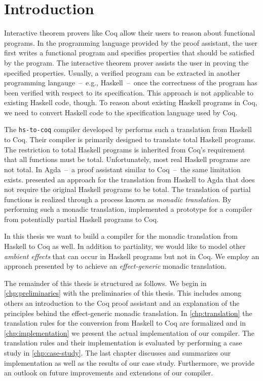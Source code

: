 \chapter{Introduction} \label{chp:introduction}

Interactive theorem provers like Coq allow their users to reason about functional programs.
In the programming language provided by the proof assistant, the user first writes a functional program and specifies properties that should be satisfied by the program.
The interactive theorem prover assists the user in proving the specified properties.
Usually, a verified program can be extracted in another programming langauge~--~e.g., Haskell~--~once the correctness of the program has been verified with respect to its specification.
This approach is not applicable to existing Haskell code, though.
To reason about existing Haskell programs in Coq, we need to convert Haskell code to the specification language used by Coq.

The \texttt{hs-to-coq} compiler developed by \cite{SpectorZabusky:2017} performs such a translation from Haskell to Coq.
Their compiler is primarily designed to translate total Haskell programs.
The restriction to total Haskell programs is inherited from Coq's requirement that all functions must be total.
Unfortunately, most real Haskell programs are not total.
In Agda~--~a proof assistant similar to Coq~--~the same limitation exists.
\cite{Abel:2005} presented an approach for the translation from Haskell to Agda that does not require the original Haskell programs to be total.
The translation of partial functions is realized through a process known as \textit{monadic translation}.
By performing such a monadic translation, \cite{Jessen:2019} implemented a prototype for a compiler from potentially partial Haskell programs to Coq.

In this thesis we want to build a compiler for the monadic translation from Haskell to Coq as well.
In addition to partiality, we would like to model other \textit{ambient effects} \citep{Christiansen:2019} that can occur in Haskell programs but not in Coq.
We employ an approach presented by \cite{Dylus:2018} to achieve an \textit{effect-generic} monadic translation.

The remainder of this thesis is structured as follows.
We begin in \autoref{chp:preliminaries} with the preliminaries of this thesis.
This includes among others an introduction to the Coq proof assistant and an explanation of the principles behind the effect-generic monadic translation.
In \autoref{chp:translation} the translation rules for the conversion from Haskell to Coq are formalized and in \autoref{chp:implementation} we present the actual implementation of our compiler.
The translation rules and their implementation is evaluated by performing a case study in \autoref{chp:case-study}.
The last chapter discusses and summarizes our implementation as well as the results of our case study.
Furthermore, we provide an outlook on future improvements and extensions of our compiler.
